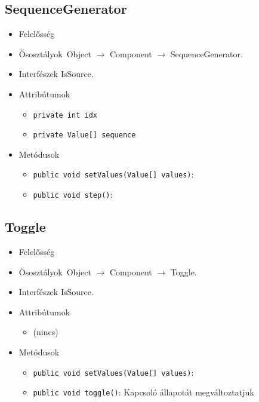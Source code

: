 \subsection{SequenceGenerator}
\begin{itemize}
\item Felelősség\\

\item Ősosztályok\ Object $\rightarrow{}$ Component $\rightarrow{}$ SequenceGenerator.
\item Interfészek IsSource.
\item Attribútumok $\ $
\begin{itemize}
	\item \texttt{private int idx} 
	\item \texttt{private Value[] sequence} 
\end{itemize}
\item Metódusok$\ $
\begin{itemize}
	\item \texttt{public void setValues(Value[] values)}: 
	\item \texttt{public void step()}: 
\end{itemize}
\end{itemize}

\subsection{Toggle}
\begin{itemize}
\item Felelősség\\

\item Ősosztályok\ Object $\rightarrow{}$ Component $\rightarrow{}$ Toggle.
\item Interfészek IsSource.
\item Attribútumok $\ $
\begin{itemize}
\item (nincs)
\end{itemize}
\item Metódusok$\ $
\begin{itemize}
	\item \texttt{public void setValues(Value[] values)}: 
	\item \texttt{public void toggle()}: Kapcsoló állapotát megváltoztatjuk
\end{itemize}
\end{itemize}

